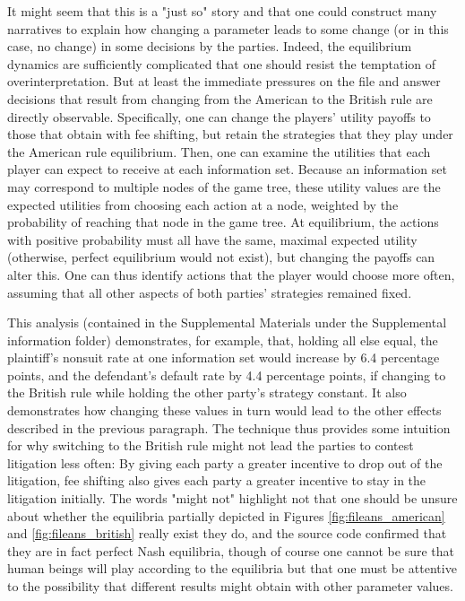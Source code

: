 \documentclass{article}
\begin{document}
It might seem that this is a "just so" story and that one could construct many narratives to explain how changing a parameter leads to some change (or in this case, no change) in some decisions by the parties. Indeed, the equilibrium dynamics are sufficiently complicated that one should resist the temptation of overinterpretation. But at least the immediate pressures on the file and answer decisions that result from changing from the American to the British rule are directly observable. Specifically, one can change the players' utility payoffs to those that obtain with fee shifting, but retain the strategies that they play under the American rule equilibrium. Then, one can examine the utilities that each player can expect to receive at each information set. Because an information set may correspond to multiple nodes of the game tree, these utility values are the expected utilities from choosing each action at a node, weighted by the probability of reaching that node in the game tree. At equilibrium, the actions with positive probability must all have the same, maximal expected utility (otherwise, perfect equilibrium would not exist), but changing the payoffs can alter this. One can thus identify actions that the player would choose more often, assuming that all other aspects of both parties' strategies remained fixed. 

This analysis (contained in the Supplemental Materials under the Supplemental information folder) demonstrates, for example, that, holding all else equal, the plaintiff's nonsuit rate at one information set would increase by 6.4 percentage points, and the defendant's default rate by 4.4 percentage points, if changing to the British rule while holding the other party's strategy constant. It also demonstrates how changing these values in turn would lead to the other effects described in the previous paragraph. The technique thus provides some intuition for why switching to the British rule might not lead the parties to contest litigation less often: By giving each party a greater incentive to drop out of the litigation, fee shifting also gives each party a greater incentive to stay in the litigation initially. The words "might not" highlight not that one should be unsure about whether the equilibria partially depicted in Figures \ref{fig:fileans_american} and \ref{fig:fileans_british} really exist \textemdash they do, and the source code confirmed that they are in fact perfect Nash equilibria, though of course one cannot be sure that human beings will play according to the equilibria \textemdash but that one must be attentive to the possibility that different results might obtain with other parameter values. 
\end{document}
